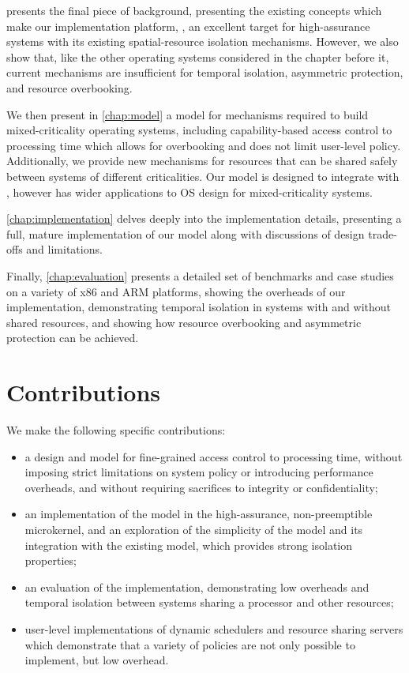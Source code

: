  presents the final piece of background, presenting the existing concepts which make
our implementation platform, \selfour, an excellent target for high-assurance systems with its
existing spatial-resource isolation mechanisms. However, we also show that, like the other operating
systems considered in the chapter before it, current mechanisms are insufficient for temporal
isolation, asymmetric protection, and resource overbooking. 

We then present in \cref{chap:model} a model for mechanisms required to build mixed-criticality operating systems,
including capability-based access control to processing time which allows for overbooking and does
not limit user-level policy. Additionally, we provide new mechanisms for resources that can be
shared safely between systems of different criticalities. Our model is designed to integrate with
\selfour, however has wider applications to \gls{OS} design for mixed-criticality systems.

\cref{chap:implementation} delves deeply into the implementation details, presenting a full, mature
implementation of our model along with discussions of design trade-offs and limitations. 

Finally, \cref{chap:evaluation} presents a detailed set of benchmarks and case studies on a variety of x86
and ARM platforms, showing the overheads
of our implementation, demonstrating temporal isolation in systems with and without shared
resources, and showing how resource overbooking and asymmetric protection can be achieved.

\section{Contributions}

We make the following specific contributions:

\begin{itemize}
    \item a design and model for fine-grained access control to processing time, without
        imposing strict limitations on system policy or introducing performance overheads, and
        without requiring sacrifices to integrity or confidentiality;
    \item an implementation of the model in the high-assurance, non-preemptible \selfour microkernel,
        and an exploration of the simplicity of the model and its integration with the existing
        model, which provides strong isolation properties;
    \item an evaluation of the implementation, demonstrating low overheads and temporal isolation
        between systems sharing a processor and other resources;
    \item user-level implementations of dynamic schedulers and resource sharing servers which
        demonstrate that a variety of policies are not only possible to implement, but low overhead.
\end{itemize}

